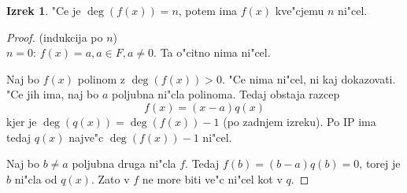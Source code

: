 \documentclass[11pt, a4paper]{article}
\theoremstyle{definition}
\newtheorem{theorem}[counter]{Izrek}
\theoremstyle{remark}
\begin{document}
	\begin{theorem}
		"Ce je $\deg(f(x)) = n$, potem ima $f(x)$ kve"cjemu $n$ ni"cel.
	\end{theorem}
	\begin{proof}(indukcija po $n$)\\
		$n = 0$: $f(x) = a, a \in F, a \neq 0$.
		Ta o"citno nima ni"cel.
		
		Naj bo $f(x)$ polinom z $\deg(f(x)) > 0$. "Ce nima ni"cel, ni kaj dokazovati. "Ce jih ima, naj bo $a$ poljubna ni"cla polinoma. Tedaj obstaja razcep 
		\[ f(x) = (x-a)q(x) \]
		kjer je $\deg(q(x)) = \deg(f(x))-1$ (po zadnjem izreku). Po IP ima tedaj $q(x)$ najve"c $\deg(f(x)) - 1$ ni"cel.
		
		Naj bo $b \neq a$ poljubna druga ni"cla $f$. Tedaj $f(b) = (b-a)q(b) = 0$, torej je $b$ ni"cla od $q(x)$. Zato v $f$ ne more biti ve"c ni"cel kot v $q$.
	\end{proof}
\end{document}

